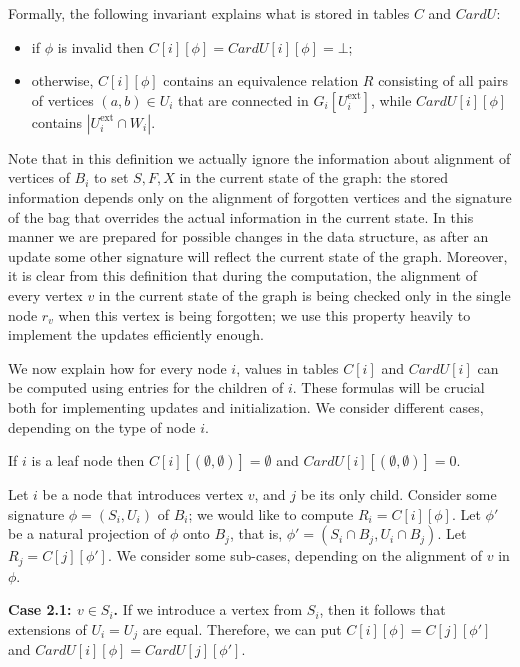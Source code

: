 \documentclass[a4paper,11pt]{article}
\theoremstyle{definition}
\theoremstyle{remark}
\newcommand{\ext}{\textrm{ext}}
\begin{document}
Formally, the following invariant explains what is stored in tables
$C$ and $CardU$:
\begin{itemize}
\item if $\phi$ is invalid then $C[i][\phi]=CardU[i][\phi]=\bot$;
\item otherwise, $C[i][\phi]$ contains an equivalence relation $R$
  consisting of all pairs of vertices $(a,b)\in U_i$ that are
  connected in $G_i[U^{\ext}_i]$, while $CardU[i][\phi]$ contains
  $|U^{\ext}_i\cap W_i|$.
\end{itemize}

Note that in this definition we actually ignore the information about
alignment of vertices of $B_i$ to set $S,F,X$ in the current state of
the graph: the stored information depends only on the alignment of forgotten
vertices and the signature of the bag that overrides the actual
information in the current state.  In this manner we are prepared for
possible changes in the data structure, as after an update some other
signature will reflect the current state of the graph.  Moreover, it
is clear from this definition that during the computation, the
alignment of every vertex $v$ in the current state of the graph is
being checked only in the single node $r_v$ when this vertex is being
forgotten; we use this property heavily to implement the updates
efficiently enough.

We now explain how for every node $i$, values in tables $C[i]$ and
$CardU[i]$ can be computed using entries for the children of $i$.
These formulas will be crucial both for implementing updates and
initialization.  We consider different cases, depending on the type of
node $i$. 

\vskip 0.3cm
 If $i$ is a leaf node then
$C[i][(\emptyset,\emptyset)]=\emptyset$ and $CardU[i][(\emptyset,\emptyset)]=0$.  \vskip 0.3cm

 Let $i$ be a node that
introduces vertex $v$, and $j$ be its only child.  Consider some
signature $\phi=(S_i,U_i)$ of $B_i$; we would like to compute
$R_i = C[i][\phi]$.  Let $\phi'$ be a natural projection of $\phi$ onto
$B_j$, that is, $\phi'=(S_i\cap B_j, U_i\cap B_j)$.  Let
$R_j = C[j][\phi']$.  We consider some sub-cases, depending on the
alignment of $v$ in $\phi$.

\vskip 0.1cm {\bf{Case 2.1: $v\in S_i$.}} If we introduce a vertex from
$S_i$, then it follows that extensions of $U_i=U_j$ are equal.
Therefore, we can put $C[i][\phi]=C[j][\phi']$ and
$CardU[i][\phi]=CardU[j][\phi']$.
\end{document}
